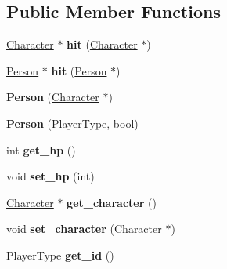\subsection*{Public Member Functions}
\begin{DoxyCompactItemize}
\item 
\hypertarget{class_person_a63ead3adb6beeedcadc0b12adbf436d4}{\hyperlink{class_character}{Character} $\ast$ {\bfseries hit} (\hyperlink{class_character}{Character} $\ast$)}\label{class_person_a63ead3adb6beeedcadc0b12adbf436d4}

\item 
\hypertarget{class_person_a996677bde06c69e7f37a9c504ae8ea09}{\hyperlink{class_person}{Person} $\ast$ {\bfseries hit} (\hyperlink{class_person}{Person} $\ast$)}\label{class_person_a996677bde06c69e7f37a9c504ae8ea09}

\item 
\hypertarget{class_person_a3a60d3f9aa1025447ab4a3591275d6c3}{{\bfseries Person} (\hyperlink{class_character}{Character} $\ast$)}\label{class_person_a3a60d3f9aa1025447ab4a3591275d6c3}

\item 
\hypertarget{class_person_ac31ec51569cb94e99e35369b5f3a9f4e}{{\bfseries Person} (Player\-Type, bool)}\label{class_person_ac31ec51569cb94e99e35369b5f3a9f4e}

\item 
\hypertarget{class_person_ae18757c3ea26b6476a3f411312620c56}{int {\bfseries get\-\_\-hp} ()}\label{class_person_ae18757c3ea26b6476a3f411312620c56}

\item 
\hypertarget{class_person_a461b44c0d259b68793e26f882b526721}{void {\bfseries set\-\_\-hp} (int)}\label{class_person_a461b44c0d259b68793e26f882b526721}

\item 
\hypertarget{class_person_ae31f5b9288af821ac8bf28fffd5894ee}{\hyperlink{class_character}{Character} $\ast$ {\bfseries get\-\_\-character} ()}\label{class_person_ae31f5b9288af821ac8bf28fffd5894ee}

\item 
\hypertarget{class_person_a3bdeadc2ca985375a6446a72e497ed7d}{void {\bfseries set\-\_\-character} (\hyperlink{class_character}{Character} $\ast$)}\label{class_person_a3bdeadc2ca985375a6446a72e497ed7d}

\item 
\hypertarget{class_person_a94f3b09f82503b4eb8d701b0d0637238}{Player\-Type {\bfseries get\-\_\-id} ()}\label{class_person_a94f3b09f82503b4eb8d701b0d0637238}


\end{DoxyCompactItemize}
